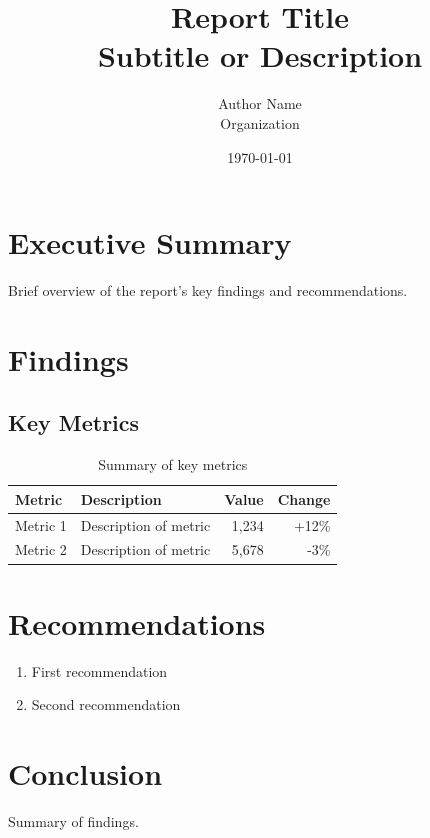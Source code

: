 \documentclass[12pt,a4paper]{article}
\title{\textbf{Report Title} \\ \large Subtitle or Description}
\author{Author Name \\ Organization}
\date{\today}
\begin{document}
\maketitle
\thispagestyle{empty}
\newpage
\tableofcontents
\newpage

\section{Executive Summary}
Brief overview of the report's key findings and recommendations.

\section{Findings}

\subsection{Key Metrics}
\begin{table}[htbp]
\centering
\begin{tabularx}{0.9\textwidth}{lXrr}
\toprule
\textbf{Metric} & \textbf{Description} & \textbf{Value} & \textbf{Change} \\
\midrule
Metric 1 & Description of metric & 1,234 & +12\% \\
Metric 2 & Description of metric & 5,678 & -3\% \\
\bottomrule
\end{tabularx}
\caption{Summary of key metrics}
\end{table}

\section{Recommendations}
\begin{enumerate}[itemsep=0.5em]
\item First recommendation
\item Second recommendation
\end{enumerate}

\section{Conclusion}
Summary of findings.
\end{document}
